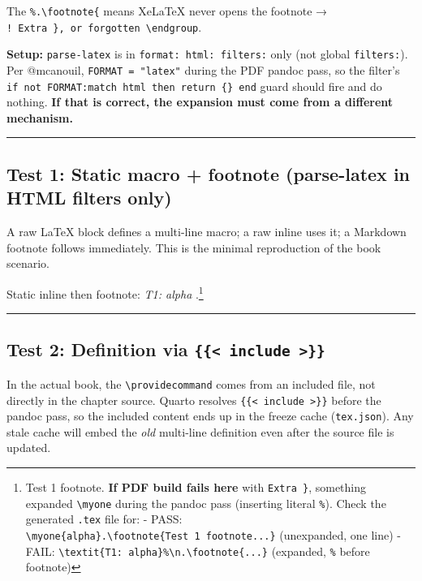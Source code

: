 \documentclass[
  letterpaper,
  DIV=11,
  numbers=noendperiod]{scrartcl}
\begin{document}
The \texttt{\%.\textbackslash{}footnote\{} means XeLaTeX never opens the
footnote →
\texttt{!\ Extra\ \},\ or\ forgotten\ \textbackslash{}endgroup}.

\textbf{Setup:} \texttt{parse-latex} is in
\texttt{format:\ html:\ filters:} only (not global \texttt{filters:}).
Per @mcanouil, \texttt{FORMAT\ =\ "latex"} during the PDF pandoc pass,
so the filter's
\texttt{if\ not\ FORMAT:match\ \textquotesingle{}html\textquotesingle{}\ then\ return\ \{\}\ end}
guard should fire and do nothing. \textbf{If that is correct, the
expansion must come from a different mechanism.}

\begin{center}\rule{0.5\linewidth}{0.5pt}\end{center}

\subsection{Test 1: Static macro + footnote (parse-latex in HTML filters
only)}\label{sec-test1}

A raw LaTeX block defines a multi-line macro; a raw inline uses it; a
Markdown footnote follows immediately. This is the minimal reproduction
of the book scenario.

\providecommand{\myone}[1]{%
  \textit{T1: #1}%
}

Static inline then footnote: \myone{alpha}.\footnote{Test 1 footnote.
  \textbf{If PDF build fails here} with \texttt{Extra\ \}}, something
  expanded \texttt{\textbackslash{}myone} during the pandoc pass
  (inserting literal \texttt{\%}). Check the generated \texttt{.tex}
  file for: - PASS:
  \texttt{\textbackslash{}myone\{alpha\}.\textbackslash{}footnote\{Test\ 1\ footnote...\}}
  (unexpanded, one line) - FAIL:
  \texttt{\textbackslash{}textit\{T1:\ alpha\}\%\textbackslash{}n.\textbackslash{}footnote\{...\}}
  (expanded, \texttt{\%} before footnote)}

\begin{center}\rule{0.5\linewidth}{0.5pt}\end{center}

\subsection{\texorpdfstring{Test 2: Definition via
\texttt{\{\{\textless{}\ include\ \textgreater{}\}\}}}{Test 2: Definition via \{\{\textless{} include \textgreater\}\}}}\label{sec-test2}

In the actual book, the \texttt{\textbackslash{}providecommand} comes
from an included file, not directly in the chapter source. Quarto
resolves \texttt{\{\{\textless{}\ include\ \textgreater{}\}\}} before
the pandoc pass, so the included content ends up in the freeze cache
(\texttt{tex.json}). Any stale cache will embed the \emph{old}
multi-line definition even after the source file is updated.
\end{document}
